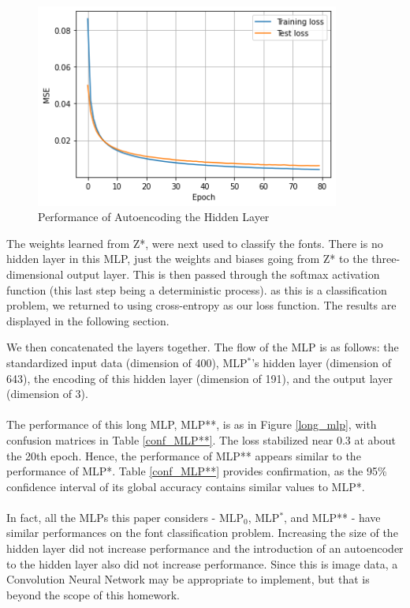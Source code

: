 \documentclass{homework}
\begin{document}
\begin{figure}
    \centering
    \includegraphics[width=10cm]{zperf.png}
    \caption{Performance of Autoencoding the Hidden Layer}
    \label{zperf}
\end{figure}

The weights learned from Z*, were next used to classify the fonts. There is no hidden layer in this MLP, just the weights and biases going from Z* to the three-dimensional output layer. This is then passed through the softmax activation function (this last step being a deterministic process). as this is a classification problem, we returned to using cross-entropy as our loss function. The results are displayed in the following section.

We then concatenated the layers together. The flow of the MLP is as follows: the standardized input data (dimension of 400), MLP$^*$'s hidden layer (dimension of 643), the encoding of this hidden layer (dimension of 191), and the output layer (dimension of 3).\\\\
The performance of this long MLP, MLP**, is as in Figure \ref{long_mlp}, with confusion matrices in Table \ref{conf_MLP**}. The loss stabilized near 0.3 at about the 20th epoch. Hence, the performance of MLP** appears similar to the performance of MLP*. Table \ref{conf_MLP**} provides confirmation, as the 95\% confidence interval of its global accuracy contains similar values to MLP*.\\\\
In fact, all the MLPs this paper considers - MLP$_0$, MLP$^*$, and MLP** - have similar performances on the font classification problem. Increasing the size of the hidden layer did not increase performance and the introduction of an autoencoder to the hidden layer also did not increase performance. Since this is image data, a Convolution Neural Network may be appropriate to implement, but that is beyond the scope of this homework.
\end{document}
